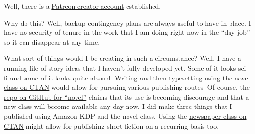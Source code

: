 Well, there is a
\href{https://patreon.com/erielookingproductions?utm_medium=unknown&utm_source=join_link&utm_campaign=creatorshare_creator&utm_content=copyLink}{Patreon
creator account} established.

Why do this? Well, backup contingency plans are always useful to have in
place. I have no security of tenure in the work that I am doing right
now in the ``day job'' so it can disappear at any time.

What sort of things would I be creating in such a circumstance? Well, I
have a running file of story ideas that I haven't fully developed yet.
Some of it looks sci-fi and some of it looks quite absurd. Writing and
then typesetting using the \href{https://ctan.org/pkg/novel}{novel class
on CTAN} would allow for pursuing various publishing routes. Of course,
the \href{https://github.com/rallg/novel}{repo on GitHub for ``novel''}
claims that its use is becoming discourage and that a new class will
become available any day now. I did make three things that I published
using Amazon KDP and the novel class. Using the
\href{https://ctan.org/pkg/newspaper}{newspaper class on CTAN} might
allow for publishing short fiction on a recurring basis too.
